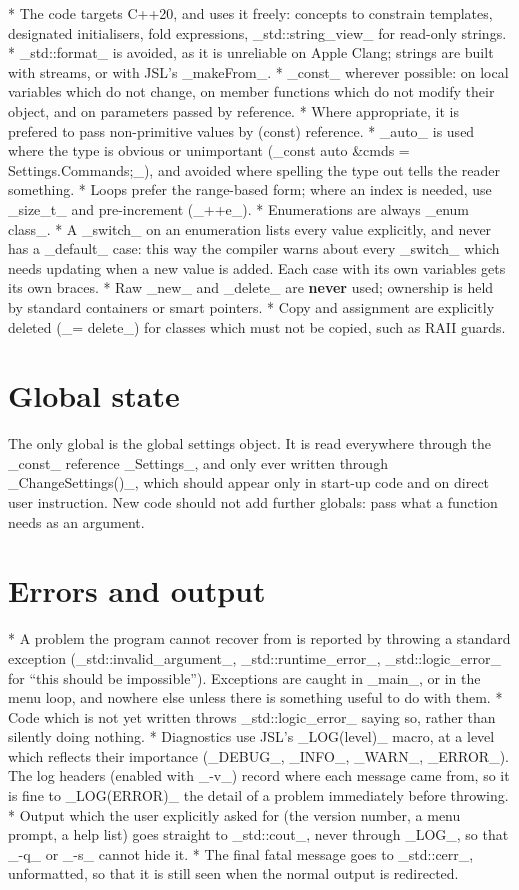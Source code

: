 	* The code targets C++20, and uses it freely: concepts to constrain templates, designated initialisers, fold expressions, _std::string\_view_ for read-only strings.
	* _std::format_ is avoided, as it is unreliable on Apple Clang; strings are built with streams, or with JSL's _makeFrom_.
	* _const_ wherever possible: on local variables which do not change, on member functions which do not modify their object, and on parameters passed by reference.
	* Where appropriate, it is prefered to pass non-primitive values by (const) reference.
	* _auto_ is used where the type is obvious or unimportant (_const auto \&cmds = Settings.Commands;_), and avoided where spelling the type out tells the reader something.
	* Loops prefer the range-based form; where an index is needed, use _size\_t_ and pre-increment (_++e_).
	* Enumerations are always _enum class_.
	* A _switch_ on an enumeration lists every value explicitly, and never has a _default_ case: this way the compiler warns about every _switch_ which needs updating when a new value is added. Each case with its own variables gets its own braces.
	* Raw _new_ and _delete_ are \textbf{never} used; ownership is held by standard containers or smart pointers.
	* Copy and assignment are explicitly deleted (_= delete_) for classes which must not be copied, such as RAII guards.

\section{Global state}

	The only global is the global settings object. It is read everywhere through the _const_ reference _Settings_, and only ever written through _ChangeSettings()_, which should appear only in start-up code and on direct user instruction. New code should not add further globals: pass what a function needs as an argument.

\section{Errors and output}

	* A problem the program cannot recover from is reported by throwing a standard exception (_std::invalid\_argument_, _std::runtime\_error_, _std::logic\_error_ for ``this should be impossible''). Exceptions are caught in _main_, or in the menu loop, and nowhere else unless there is something useful to do with them.
	* Code which is not yet written throws _std::logic\_error_ saying so, rather than silently doing nothing.
	* Diagnostics use JSL's _LOG(level)_ macro, at a level which reflects their importance (_DEBUG_, _INFO_, _WARN_, _ERROR_). The log headers (enabled with _-v_) record where each message came from, so it is fine to _LOG(ERROR)_ the detail of a problem immediately before throwing.
	* Output which the user explicitly asked for (the version number, a menu prompt, a help list) goes straight to _std::cout_, never through _LOG_, so that _-q_ or _-s_ cannot hide it.
	* The final fatal message goes to _std::cerr_, unformatted, so that it is still seen when the normal output is redirected.
